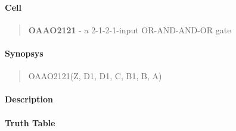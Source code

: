 \label{OAAO2121}
\paragraph{Cell}
\begin{quote}
    \textbf{OAAO2121} - a 2-1-2-1-input OR-AND-AND-OR gate
\end{quote}

\paragraph{Synopsys}
\begin{quote}
    OAAO2121(Z, D1, D1, C, B1, B, A)
\end{quote}

\paragraph{Description}

%

\paragraph{Truth Table}
%

